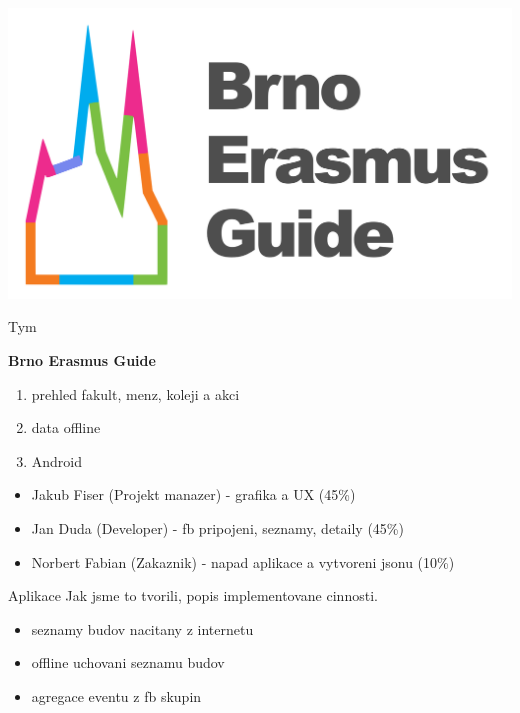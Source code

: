 \documentclass[pdf]{beamer}
\begin{document}
\begin{frame}
  \begin{center}
    \includegraphics[scale=0.13]{app_menu_header}
  \end{center}
\end{frame}

\begin{frame}{Tym}
  \begin{minipage}{\textwidth}
    \textbf{Brno Erasmus Guide}
    \begin{enumerate}
      \item prehled fakult, menz, koleji a akci
      \item data offline
      \item Android
    \end{enumerate}
    \vspace{2\baselineskip}
  \end{minipage}
  \begin{minipage}{\textwidth}
    \begin{itemize}
      \item Jakub Fiser (Projekt manazer) - grafika a UX (45\%)
      \item Jan Duda (Developer) - fb pripojeni, seznamy, detaily (45\%)
      \item Norbert Fabian (Zakaznik) - napad aplikace a vytvoreni jsonu (10\%)
    \end{itemize}  
  \end{minipage}
\end{frame}

\begin{frame}{Aplikace}
  Jak jsme to tvorili, popis implementovane cinnosti.
 \begin{itemize}
   \item seznamy budov nacitany z internetu
   \item offline uchovani seznamu budov
   \item agregace eventu z fb skupin
 \end{itemize}  
\end{frame}
\end{document}
